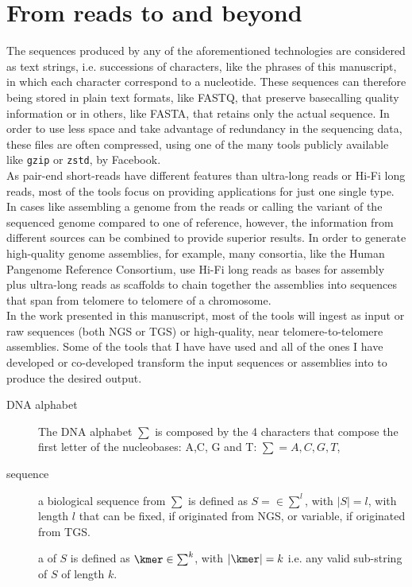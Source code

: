 \section{From reads to \kmers and beyond}
\label{sec:kmer}
The sequences produced by any of the aforementioned technologies are considered as text strings, i.e. successions of characters, like the phrases of this manuscript, in which each character correspond to a nucleotide. These sequences can therefore being stored in plain text formats, like FASTQ, that preserve basecalling quality information or in others, like FASTA, that retains only the actual sequence. In order to use less space and take advantage of redundancy in the sequencing data, these files are often compressed, using one of the many tools publicly available like \texttt{gzip} or \texttt{zstd}, by Facebook. \\
As pair-end short-reads have different features than ultra-long reads or Hi-Fi long reads, most of the tools focus on providing applications for just one single type. In cases like assembling a genome from the reads or calling the variant of the sequenced genome compared to one of reference, however, the information from different sources can be combined to provide superior results. In order to generate high-quality genome assemblies, for example, many consortia, like the Human Pangenome Reference Consortium, use Hi-Fi long reads as bases for assembly plus ultra-long reads as scaffolds to chain together the assemblies into sequences that span from telomere to telomere of a chromosome.\\
In the work presented in this manuscript, most of the tools will ingest as input or raw sequences (both NGS or TGS) or high-quality, near telomere-to-telomere assemblies. Some of the tools that I have have used and all of the ones I have developed or co-developed transform the input sequences or assemblies into \kmers to produce the desired output. \\
\begin{description}
	\item[DNA alphabet] The DNA alphabet $\sum$ is composed by the 4 characters that compose the first letter of the nucleobases: A,C, G and T: $ \sum = {A, C, G, T}$, 
	\item[sequence] a biological sequence from $\sum$ is defined as $ S =\in \sum^{l}$, with $\lvert S \rvert = l $, with length $l$ that can be fixed, if originated from NGS, or variable, if originated from TGS.
	\item[\kmer] a \kmer of $S$ is defined as $ \kmer \in \sum^{k}$, with $\lvert \kmer \rvert = k $ i.e. any valid sub-string of $S$ of length $k$. 
\end{description}
